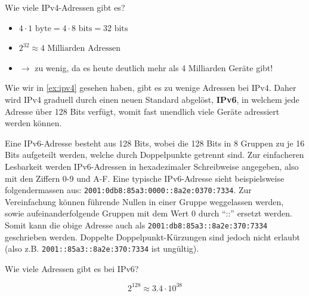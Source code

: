 \begin{myexercise}\label{ex:ipv4}
	Wie viele \gls{IP}v4-Adressen gibt es?
	\begin{myanswer}
		\begin{itemize}
			\item $4\cdot 1 \text{ byte} = 4\cdot 8 \text{ bits} = 32 \text{ bits}$
			\item $2^{32} \approx 4 \text{ Milliarden Adressen}$
			\item $\rightarrow$ zu wenig, da es heute deutlich mehr als 4 Milliarden Geräte gibt!
		\end{itemize}
	\end{myanswer}
\end{myexercise}
Wie wir in \cref{ex:ipv4} gesehen haben, gibt es zu wenige Adressen bei \gls{IP}v4. Daher wird \gls{IP}v4 graduell durch einen neuen Standard abgelöst, \textbf{\gls{IP}v6}, in welchem jede Adresse über 128 Bits verfügt, womit fast unendlich viele Geräte adressiert werden können.

\begin{mydefinition}
Eine \gls{IP}v6-Adresse besteht aus 128 Bits, wobei die 128 Bits in 8 Gruppen zu je 16 Bits aufgeteilt werden, welche durch Doppelpunkte getrennt sind. Zur einfacheren Lesbarkeit werden \gls{IP}v6-Adressen in hexadezimaler Schreibweise angegeben, also mit den Ziffern 0-9 und A-F. Eine typische \gls{IP}v6-Adresse sieht beispielsweise folgendermassen aus: \texttt{2001:0db8:85a3:0000::8a2e:0370:7334}. Zur Vereinfachung können führende Nullen in einer Gruppe weggelassen werden, sowie aufeinanderfolgende Gruppen mit dem Wert 0 durch \enquote{::} ersetzt werden. Somit kann die obige Adresse auch als \texttt{2001:db8:85a3::8a2e:370:7334} geschrieben werden. Doppelte Doppelpunkt-Kürzungen sind jedoch nicht erlaubt (also z.B. \texttt{2001::85a3::\allowbreak 8a2e:370:7334} ist ungültig).
\end{mydefinition}

\begin{myexercise}
	Wie viele Adressen gibt es bei \gls{IP}v6?
	\begin{myanswer}
		\[2^{128} \approx 3.4\cdot 10^{38}\]
	\end{myanswer}
\end{myexercise}

